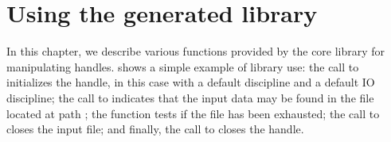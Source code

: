 \chapter{Using the generated library}
\label{chap:library-use}
In this chapter, we describe various functions provided by the core
\pads{} library for manipulating \pads{} handles.
 shows a simple example of library use:
the call to  initializes the \pads{} handle, in this case
with a default \pads{} discipline and a default IO discipline;
the call to  indicates that the input data may be
found in the file located at path ; 
the function  tests if the file has been exhausted;
the call to  closes the input file; and finally,
the call to  closes the \pads{} handle.

